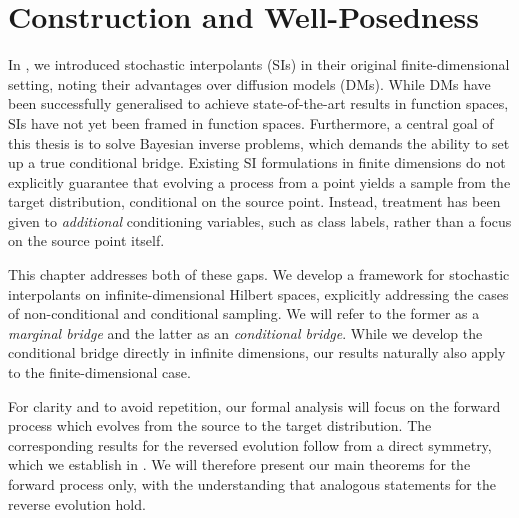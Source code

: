 \chapter{Construction and Well-Posedness}\label{cha:3}

\ifpdf
\graphicspath{{Chapter3/Figs/Raster/}{Chapter3/Figs/PDF/}{Chapter3/Figs/}}
\else
\graphicspath{{Chapter3/Figs/Vector/}{Chapter3/Figs/}}
\fi

In , we introduced stochastic interpolants (SIs) in their original finite-dimensional setting, noting their advantages over diffusion models (DMs). While DMs have been successfully generalised to achieve state-of-the-art results in function spaces, SIs have not yet been framed in function spaces. %
Furthermore, a central goal of this thesis is to solve Bayesian inverse problems, which demands the ability to set up a true conditional bridge. Existing SI formulations in finite dimensions do not explicitly guarantee that evolving a process from a point yields a sample from the target distribution, conditional on the source point. Instead, treatment has been given to \textit{additional} conditioning variables, such as class labels, rather than a focus on the source point itself.

This chapter addresses both of these gaps. We develop a framework for stochastic interpolants on infinite-dimensional Hilbert spaces, explicitly addressing the cases of non-conditional and conditional  sampling. We will refer to the former as a \textit{marginal bridge} and the latter as an \textit{conditional bridge}. While we develop the conditional bridge directly in infinite dimensions, our results naturally also apply to the finite-dimensional case.

For clarity and to avoid repetition, our formal analysis will focus on the forward process which evolves from the source to the target distribution. The corresponding results for the reversed evolution follow from a direct symmetry, which we establish in . We will therefore present our main theorems for the forward process only, with the understanding that analogous statements for the reverse evolution hold.

